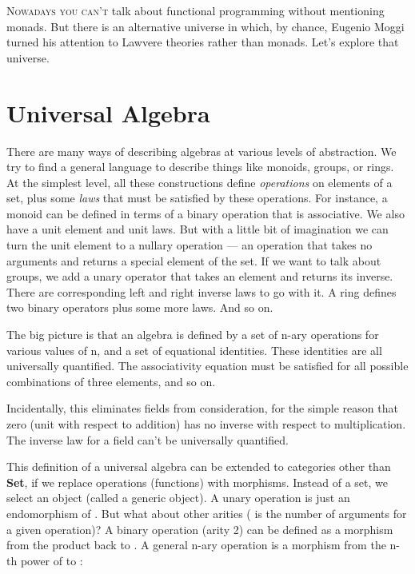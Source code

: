 \lettrine[lhang=0.17]{N}{owadays you can't} talk about functional programming without mentioning
monads. But there is an alternative universe in which, by chance,
Eugenio Moggi turned his attention to Lawvere theories rather than
monads. Let's explore that universe.

\section{Universal Algebra}\label{universal-algebra}

There are many ways of describing algebras at various levels of
abstraction. We try to find a general language to describe things like
monoids, groups, or rings. At the simplest level, all these
constructions define \emph{operations} on elements of a set, plus some
\emph{laws} that must be satisfied by these operations. For instance, a
monoid can be defined in terms of a binary operation that is
associative. We also have a unit element and unit laws. But with a
little bit of imagination we can turn the unit element to a nullary
operation --- an operation that takes no arguments and returns a special
element of the set. If we want to talk about groups, we add a unary
operator that takes an element and returns its inverse. There are
corresponding left and right inverse laws to go with it. A ring defines
two binary operators plus some more laws. And so on.

The big picture is that an algebra is defined by a set of n-ary
operations for various values of n, and a set of equational identities.
These identities are all universally quantified. The associativity
equation must be satisfied for all possible combinations of three
elements, and so on.

Incidentally, this eliminates fields from consideration, for the simple
reason that zero (unit with respect to addition) has no inverse with
respect to multiplication. The inverse law for a field can't be
universally quantified.

This definition of a universal algebra can be extended to categories
other than \textbf{Set}, if we replace operations (functions) with
morphisms. Instead of a set, we select an object  (called a
generic object). A unary operation is just an endomorphism of
. But what about other arities ( is the number of
arguments for a given operation)? A binary operation (arity 2) can be
defined as a morphism from the product  back to .
A general n-ary operation is a morphism from the n-th power of
 to :


